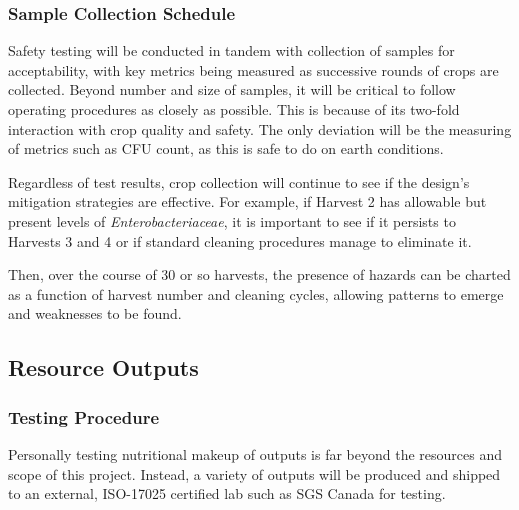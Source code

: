\subsubsection{Sample Collection Schedule}
Safety testing will be conducted in tandem with collection of samples for acceptability, with key metrics being measured as successive rounds of crops are collected. Beyond number and size of samples, it will be critical to follow operating procedures as closely as possible. This is because of its two-fold interaction with crop quality and safety. The only deviation will be the measuring of metrics such as CFU count, as this is safe to do on earth conditions.

Regardless of test results, crop collection will continue to see if the design's mitigation strategies are effective. For example, if Harvest 2 has allowable but present levels of \textit{Enterobacteriaceae}, it is important to see if it persists to Harvests 3 and 4 or if standard cleaning procedures manage to eliminate it.

Then, over the course of 30 or so harvests, the presence of hazards can be charted as a function of harvest number and cleaning cycles, allowing patterns to emerge and weaknesses to be found.



\clearpage

\subsection{Resource Outputs}

\subsubsection{Testing Procedure}

Personally testing nutritional makeup of outputs is far beyond the resources and scope of this project. Instead, a variety of outputs will be produced and shipped to an external, ISO-17025 certified lab such as SGS Canada for testing.

